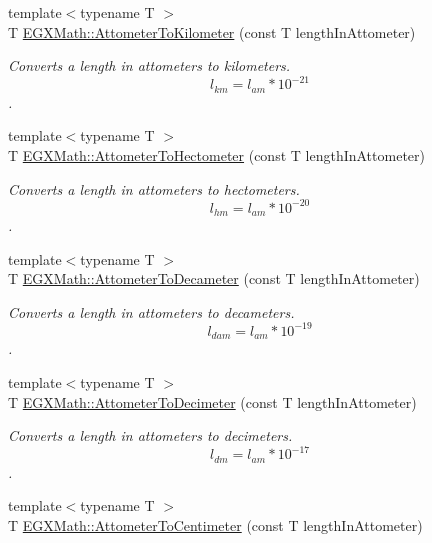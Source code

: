 \begin{DoxyCompactItemize}
{\footnotesize template$<$typename T $>$ }\\T \mbox{\hyperlink{group___e_g_x_math-_conversions-_length_conversions-_s_i-_attometer-_s_i_gafc247d0f5b16a1e83c2f210812ee41e8}{E\+G\+X\+Math\+::\+Attometer\+To\+Kilometer}} (const T length\+In\+Attometer)
\begin{DoxyCompactList}\small\item\em Converts a length in attometers to kilometers. \[ l_{km}=l_{am} * 10^{-21} \]. \end{DoxyCompactList}\item 
{\footnotesize template$<$typename T $>$ }\\T \mbox{\hyperlink{group___e_g_x_math-_conversions-_length_conversions-_s_i-_attometer-_s_i_gab810b8625e44d4bb227bdff1b0ab2056}{E\+G\+X\+Math\+::\+Attometer\+To\+Hectometer}} (const T length\+In\+Attometer)
\begin{DoxyCompactList}\small\item\em Converts a length in attometers to hectometers. \[ l_{hm}=l_{am} * 10^{-20} \]. \end{DoxyCompactList}\item 
{\footnotesize template$<$typename T $>$ }\\T \mbox{\hyperlink{group___e_g_x_math-_conversions-_length_conversions-_s_i-_attometer-_s_i_gadfda74b37224249b3fb2644fb9611d95}{E\+G\+X\+Math\+::\+Attometer\+To\+Decameter}} (const T length\+In\+Attometer)
\begin{DoxyCompactList}\small\item\em Converts a length in attometers to decameters. \[ l_{dam}=l_{am} * 10^{-19} \]. \end{DoxyCompactList}\item 
{\footnotesize template$<$typename T $>$ }\\T \mbox{\hyperlink{group___e_g_x_math-_conversions-_length_conversions-_s_i-_attometer-_s_i_gaa819fb588dcc42855d8e40578b54527e}{E\+G\+X\+Math\+::\+Attometer\+To\+Decimeter}} (const T length\+In\+Attometer)
\begin{DoxyCompactList}\small\item\em Converts a length in attometers to decimeters. \[ l_{dm}=l_{am} * 10^{-17} \]. \end{DoxyCompactList}\item 
{\footnotesize template$<$typename T $>$ }\\T \mbox{\hyperlink{group___e_g_x_math-_conversions-_length_conversions-_s_i-_attometer-_s_i_gaff6439c15e3bb4a90595864e814960a7}{E\+G\+X\+Math\+::\+Attometer\+To\+Centimeter}} (const T length\+In\+Attometer)

\end{DoxyCompactItemize}
